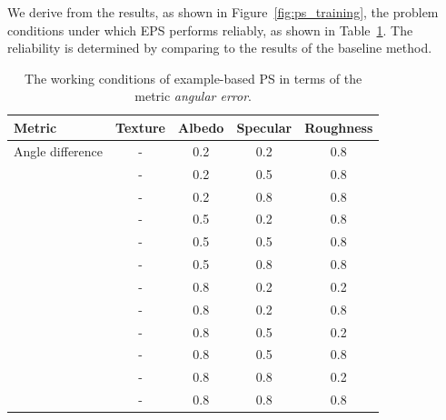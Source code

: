 We derive from the results, as shown in Figure~\ref{fig:ps_training}, the problem conditions under which EPS performs reliably, as shown in Table~\ref{tab:ps_training_result}. The reliability is determined by comparing to the results of the baseline method.
\begin{table}[!htbp]
  \centering
  \begin{tabular}{l*{4}{c}}
  \hline
  \textbf{Metric} & Texture & Albedo & Specular & Roughness\\
  \hline
  Angle difference & - & 0.2 & 0.2 & 0.8\\
                   & - & 0.2 & 0.5 & 0.8\\
                   & - & 0.2 & 0.8 & 0.8\\
                   & - & 0.5 & 0.2 & 0.8\\
                   & - & 0.5 & 0.5 & 0.8\\
                   & - & 0.5 & 0.8 & 0.8\\
                   & - & 0.8 & 0.2 & 0.2\\ %
                   & - & 0.8 & 0.2 & 0.8\\
                   & - & 0.8 & 0.5 & 0.2\\
                   & - & 0.8 & 0.5 & 0.8\\
                   & - & 0.8 & 0.8 & 0.2\\ %
                   & - & 0.8 & 0.8 & 0.8\\
  \hline
  \end{tabular}
  \caption{The working conditions of example-based PS in terms of the metric \textit{angular error}.}
  \label{tab:ps_training_result}
\end{table}

